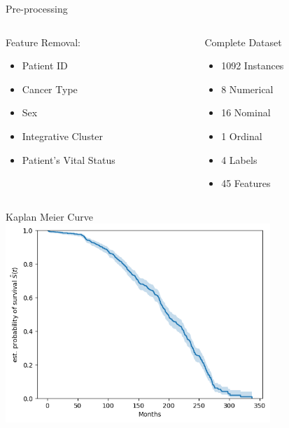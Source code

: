 \documentclass{beamer}
\begin{document}
\begin{frame}{Pre-processing}
    \begin{columns}
        \begin{column}{0.49 \textwidth}
            Feature Removal:
            \begin{itemize}
                \item Patient ID
                \item Cancer Type
                \item Sex
                \item Integrative Cluster
                \item Patient's Vital Status
            \end{itemize}
        \end{column}
        \begin{column}{0.49 \textwidth}
            Complete Dataset
            \begin{itemize}
                \item 1092 Instances
                \item 8 Numerical
                \item 16 Nominal
                \item 1 Ordinal
                \item 4 Labels
                \item 45 Features
            \end{itemize}
        \end{column}
    \end{columns}
\end{frame}

\begin{frame}{Kaplan Meier Curve}
    \centering
    \includegraphics[width = 0.75\textwidth]{images/kmc_r.png}
\end{frame}
\end{document}
